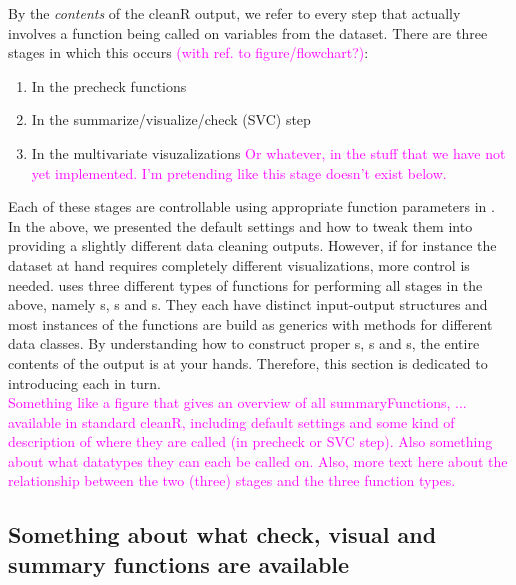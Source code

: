 \documentclass[article]{jss}
\newcommand{\hl}[1]{\textcolor{magenta}{#1}}
\begin{document}
By the \textit{contents} of the cleanR output, we refer to every step that actually involves a function being called on variables from the dataset. There are three stages in which this occurs \hl{(with ref. to figure/flowchart?)}:
\begin{enumerate}
\item In the precheck functions
\item In the summarize/visualize/check (SVC) step
\item In the multivariate visuzalizations \hl{Or whatever, in the stuff that we have not yet implemented. I'm pretending like this stage doesn't exist below.}
\end{enumerate}
Each of these stages are controllable using appropriate function parameters in . In the above, we presented the default  settings and how to tweak them into providing a slightly different data cleaning outputs. However, if for instance the dataset at hand requires completely different visualizations, more control is needed.  uses three different types of functions for performing all stages in the above, namely s, s and s. They each have distinct input-output structures and most instances of the functions are build as  generics with methods for different data classes. By understanding how to construct proper s, s and s, the entire contents of the  output is at your hands. Therefore, this section is dedicated to introducing each in turn.\\

\hl{Something like a figure that gives an overview of all summaryFunctions, ... available in standard cleanR, including default settings and some kind of description of where they are called (in precheck or SVC step). Also something about what datatypes they can each be called on. Also, more text here about the relationship between the two (three) stages and the three function types.}

\subsection{Something about what check, visual and summary functions are available}
\end{document}
